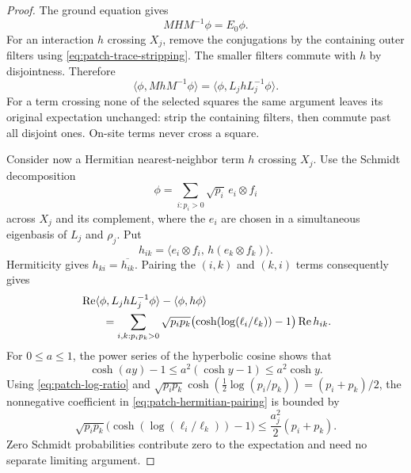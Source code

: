 \begin{proof}
The ground equation gives
\[
 M H M^{-1}\phi=E_0\phi.
\]
For an interaction \(h\) crossing \(X_j\), remove the conjugations
by the containing outer filters using
\eqref{eq:patch-trace-stripping}.  The smaller filters commute
with \(h\) by disjointness.  Therefore
\begin{equation}
 \langle\phi,MhM^{-1}\phi\rangle
       =\langle\phi,L_j h L_j^{-1}\phi\rangle.
 \label{eq:patch-single-crossing}
\end{equation}
For a term crossing none of the selected squares the same argument
leaves its original expectation unchanged: strip the containing
filters, then commute past all disjoint ones.  On-site terms never
cross a square.

Consider now a Hermitian nearest-neighbor term \(h\) crossing
\(X_j\).  Use the Schmidt decomposition
\[
 \phi=\sum_{i:p_i>0}\sqrt{p_i}\,
          e_i\otimes f_i
\]
across \(X_j\) and its complement, where the \(e_i\) are chosen
in a simultaneous eigenbasis of \(L_j\) and \(\rho_j\).  Put
\[
 h_{ik}=\langle e_i\otimes f_i,\,
                       h(e_k\otimes f_k)\rangle.
\]
Hermiticity gives \(h_{ki}=\overline{h_{ik}}\).  Pairing the
\((i,k)\) and \((k,i)\) terms consequently gives
\begin{align}
 &\operatorname{Re}\langle\phi,L_j h L_j^{-1}\phi\rangle
           -\langle\phi,h\phi\rangle \notag\\
 &\qquad =
   \sum_{i,k:p_i p_k>0}
      \sqrt{p_i p_k}
      \bigl(\cosh(\log(\ell_i/\ell_k))-1\bigr)
      \operatorname{Re}h_{ik}.
 \label{eq:patch-hermitian-pairing}
\end{align}
For \(0\leq a\leq1\), the power series of the hyperbolic cosine
shows that
\[
 \cosh(ay)-1\leq a^2(\cosh y-1)\leq a^2\cosh y.
\]
Using \eqref{eq:patch-log-ratio} and
\(\sqrt{p_i p_k}\cosh(\tfrac12\log(p_i/p_k))
=(p_i+p_k)/2\), the nonnegative coefficient in
\eqref{eq:patch-hermitian-pairing} is bounded by
\begin{equation}
 \sqrt{p_i p_k}
      \bigl(\cosh(\log(\ell_i/\ell_k))-1\bigr)
       \leq \frac{a_j^2}{2}(p_i+p_k).
 \label{eq:patch-quadratic-coefficient}
\end{equation}
Zero Schmidt probabilities contribute zero to the expectation
and need no separate limiting argument.


\end{proof}
